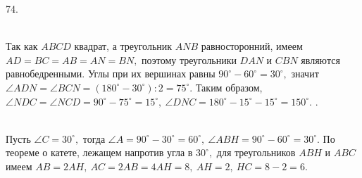 \documentclass[12pt]{article}
\begin{document}
74.  \begin{figure}[ht!]
\end{figure}\\
Так как $ABCD$ квадрат, а треугольник $ANB$ равносторонний, имеем $AD=BC=AB=AN=BN,$ поэтому треугольники $DAN$ и $CBN$ являются равнобедренными. Углы при их вершинах равны $90^\circ-60^\circ=30^\circ,$ значит $\angle ADN=\angle BCN=(180^\circ-30^\circ):2=75^\circ.$ Таким образом, $\angle NDC=\angle NCD=90^\circ-75^\circ=15^\circ,\ \angle DNC=180^\circ-15^\circ-15^\circ=150^\circ.$\newpage
{}. \begin{figure}[ht!]
\end{figure}\\
Пусть $\angle C=30^\circ,$ тогда $\angle A=90^\circ-30^\circ=60^\circ,\ \angle ABH=90^\circ-60^\circ=30^\circ.$ По теореме о катете, лежащем напротив угла в $30^\circ,$ для треугольников $ABH$ и $ABC$ имеем $AB=2AH,\ AC=2AB=4AH=8,\ AH=2,\ HC=8-2=6.$\\
\end{document}
